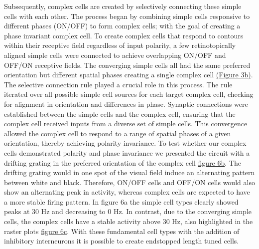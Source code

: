 \documentclass[12pt]{article}
\begin{document}
Subsequently, complex cells are created by selectively connecting these simple cells with each other. The process began by combining simple cells responsive to different phases (ON/OFF) to form complex cells; with the goal of creating a phase invariant complex cell. To create complex cells that respond to contours within their receptive field regardless of input polarity, a few retinotopically aligned simple cells were connected to achieve overlapping ON/OFF and OFF/ON receptive fields. The converging simple cells all had the same preferred orientation but different spatial phases creating a single complex cell \hyperref[fig:LIF_Overview]{(Figure 3b)}. The selective connection rule played a crucial role in this process. The rule iterated over all possible simple cell sources for each target complex cell, checking for alignment in orientation and differences in phase. Synaptic connections were established between the simple cells and the complex cell, ensuring that the complex cell received inputs from a diverse set of simple cells. This convergence allowed the complex cell to respond to a range of spatial phases of a given orientation, thereby achieving polarity invariance. To test whether our complex cells demonstrated polarity and phase invariance we presented the circuit with a drifting grating in the preferred orientation of the complex cell \hyperref[fig:polarity invariance]{figure 6b}. The drifting grating would in one spot of the visual field induce an alternating pattern between white and black. Therefore, ON/OFF cells and OFF/ON cells would also show an alternating peak in activity, whereas complex cells are expected to have a more stable firing pattern. In figure 6a the simple cell types clearly showed peaks at 30 Hz and decreasing to 0 Hz. In contrast, due to the converging simple cells, the complex cells have a stable activity above 30 Hz, also highlighted in the raster plots \hyperref[fig:polarity invariance]{figure 6c}. With these fundamental cell types with the addition of inhibitory interneurons it is possible to create endstopped length tuned cells. 
\end{document}
